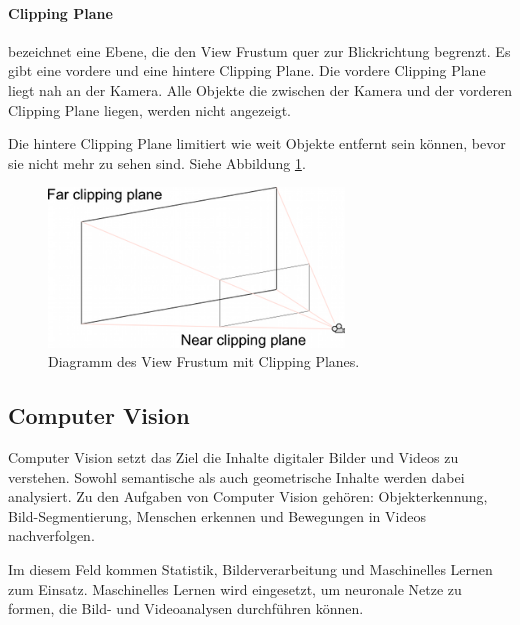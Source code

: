 \paragraph{Clipping Plane}
bezeichnet eine Ebene, die den View Frustum quer zur Blickrichtung begrenzt. 
Es gibt eine vordere und eine hintere Clipping Plane.
Die vordere Clipping Plane liegt nah an der Kamera. Alle Objekte die zwischen der Kamera und der vorderen Clipping Plane liegen, werden nicht angezeigt.

Die hintere Clipping Plane limitiert wie weit Objekte entfernt sein können, bevor sie nicht mehr zu sehen sind. Siehe Abbildung \ref{dia:clipping}.

\begin{figure}[H]
	\centering
	\includegraphics[width=0.7\textwidth]{images/dia_ViewFrustum.png}
	\caption[]{Diagramm des View Frustum mit Clipping Planes.\citep{unityclipping}}
	\label{dia:clipping}
\end{figure}


\subsection{Computer Vision}
Computer Vision setzt das Ziel die Inhalte digitaler Bilder und Videos zu verstehen. Sowohl semantische als auch geometrische Inhalte werden dabei analysiert. 
Zu den Aufgaben von Computer Vision gehören: Objekterkennung, Bild-Segmentierung, Menschen erkennen und Bewegungen in Videos nachverfolgen.



Im diesem Feld kommen Statistik, Bilderverarbeitung und Maschinelles Lernen zum Einsatz. Maschinelles Lernen wird eingesetzt, um neuronale Netze zu formen, die Bild- und Videoanalysen durchführen können.\citep{intortodeeplearingmedical}

